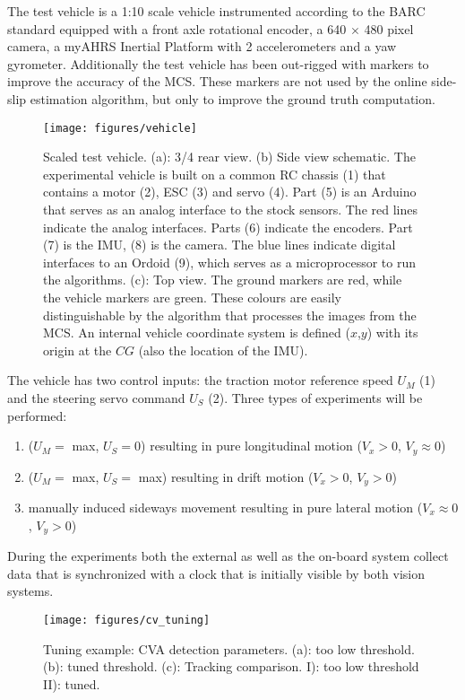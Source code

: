 \documentclass[letterpaper, 10 pt, conference]{ieeeconf}
\begin{document}
The test vehicle is a 1:10 scale vehicle instrumented according to the BARC standard \cite{BARC} equipped with a front axle rotational encoder, a 640 $\times$ 480 pixel camera, a myAHRS Inertial Platform with 2 accelerometers and a yaw gyrometer. Additionally the test vehicle has been out-rigged with markers to improve the accuracy of the MCS. These markers are not used by the online side-slip estimation algorithm, but only to improve the ground truth computation.
\begin{figure}[h]
\centering
{}
{\texttt{[image: figures/vehicle]}}
\caption{ Scaled test vehicle. (a): 3/4 rear view. (b) Side view schematic. The experimental vehicle is built on a common RC chassis (1) that contains a motor (2), ESC (3) and servo (4). Part (5) is an Arduino that serves as an analog interface to the stock sensors. The red lines indicate the analog interfaces. Parts (6) indicate the encoders. Part (7) is the IMU, (8) is the camera. The blue lines indicate digital interfaces to an Ordoid (9), which serves as a microprocessor to run the algorithms. (c): Top view. The ground markers are red, while the vehicle markers are green. These colours are easily distinguishable by the algorithm that processes the images from the MCS. An internal vehicle coordinate system is defined ($x$,$y$) with its origin at the $CG$ (also the location of the IMU).}
\label{fig:vehicle}
\end{figure}
The vehicle has two control inputs: the traction motor reference speed $U_M$ (1) and the steering servo command $U_S$ (2). Three types of experiments will be performed:
\begin{enumerate}
	\item  ($U_M =$ max, $U_S = 0$) resulting in pure longitudinal motion ($V_x > 0$, $V_y \approx 0$)
	\item ($U_M =$ max, $U_S =$ max) resulting in  drift motion ($V_x > 0$, $V_y > 0$)
	\item manually induced sideways movement resulting in pure lateral motion ($V_x \approx 0$, $V_y > 0$)
\end{enumerate}
During the experiments both the external as well as the on-board system collect data that is synchronized with a clock that is initially visible by both vision systems.
\begin{figure*}[!h]
\centering
{}
{\texttt{[image: figures/cv\_tuning]}}
\caption{Tuning example: CVA detection parameters. (a): too low threshold. (b): tuned threshold. (c): Tracking comparison. I): too low threshold II): tuned.}
\label{fig:cv_tuning}
\end{figure*}
\end{document}
